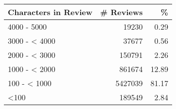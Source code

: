 \begin{tabular}{lrr}
\toprule
Characters in Review &  \# Reviews &      \% \\
\midrule
         4000 - 5000 &      19230 &   0.29 \\
       3000 - < 4000 &      37677 &   0.56 \\
       2000 - < 3000 &     150791 &   2.26 \\
       1000 - < 2000 &     861674 &  12.89 \\
        100 - < 1000 &    5427039 &  81.17 \\
                <100 &     189549 &   2.84 \\
\bottomrule
\end{tabular}
